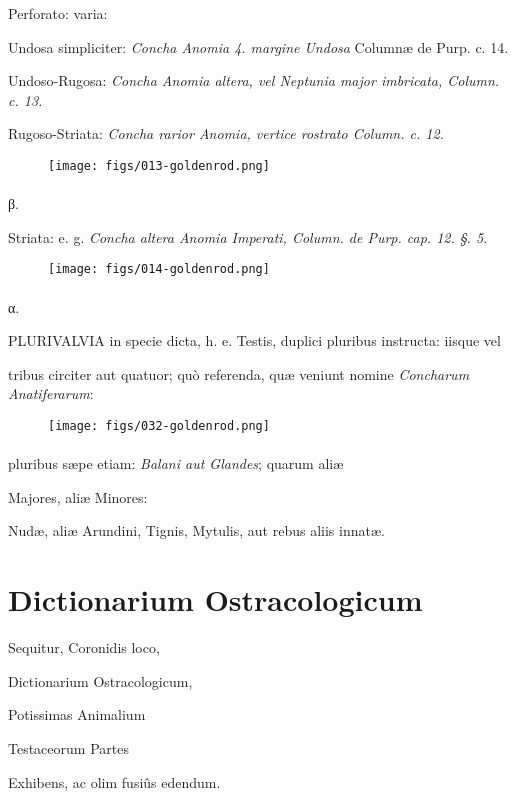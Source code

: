 \documentclass[a4paper, 11pt, oneside, polutonikogreek, german]{article}
\begin{document}
Perforato: varia:

Undosa simpliciter: \emph{Concha Anomia 4. margine Undosa} Columnæ de Purp. c. 14.

Undoso-Rugosa: \emph{Concha Anomia altera, vel Neptunia major imbricata, Column. c. 13.}

Rugoso-Striata: \emph{Concha rarior Anomia, vertice rostrato Column. c. 12.}

\begin{figure}[H]
\centering
\texttt{[image: figs/013-goldenrod.png]}
\end{figure}
\paragraph{}
β.

Striata: e. g. \emph{Concha altera Anomia Imperati, Column. de Purp. cap. 12. §. 5.}

\begin{figure}[H]
\centering
\texttt{[image: figs/014-goldenrod.png]}
\end{figure}
\paragraph{}
α.

PLURIVALVIA in specie dicta, h. e. Testis, duplici pluribus instructa: iisque vel

tribus circiter aut quatuor; quò referenda, quæ veniunt nomine \emph{Concharum Anatiferarum}:

\begin{figure}[H]
\centering
\texttt{[image: figs/032-goldenrod.png]}
\end{figure}
\paragraph{}
pluribus sæpe etiam: \emph{Balani aut Glandes}; quarum aliæ

Majores, aliæ Minores:

Nudæ, aliæ Arundini, Tignis, Mytulis, aut rebus aliis innatæ.

\bigskip
\centerline{\EightStarTaper}
\centerline{\EightStarTaper\EightStarTaper}
\bigskip
\clearpage
\section{Dictionarium Ostracologicum}
\begin{center}
\footnotesize Sequitur, Coronidis loco,

Dictionarium Ostracologicum,

\footnotesize Potissimas Animalium

\footnotesize  Testaceorum Partes

\footnotesize Exhibens, ac olim fusiûs edendum.
\end{center}
\end{document}
